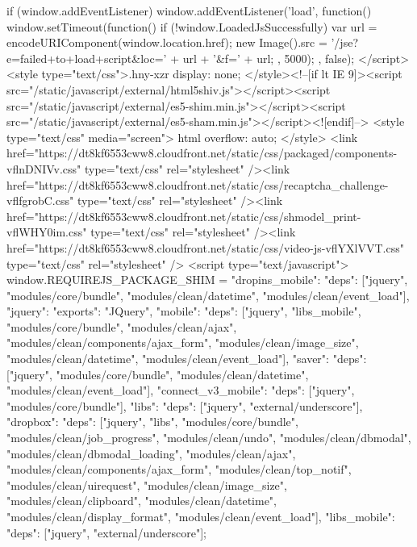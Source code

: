 {    if (window.addEventListener) {
        window.addEventListener('load', function() {
            window.setTimeout(function() {
                if (!window.LoadedJsSuccessfully) {
                    var url = encodeURIComponent(window.location.href);
                    new Image().src = '/jse?e=failed+to+load+script&loc=' + url + '&f=' + url;
                }
            }, 5000);
        }, false);
    }
</script><style type="text/css">.hny-xzr { display: none; }</style><!--[if lt IE 9]><script src="/static/javascript/external/html5shiv.js"></script><script src="/static/javascript/external/es5-shim.min.js"></script><script src="/static/javascript/external/es5-sham.min.js"></script><![endif]-->  
            <style type="text/css" media="screen">
                html {
                  overflow: auto;
                }
            </style>
        <link href="https://dt8kf6553cww8.cloudfront.net/static/css/packaged/components-vflnDNIVv.css" type="text/css" rel="stylesheet" /><link href="https://dt8kf6553cww8.cloudfront.net/static/css/recaptcha_challenge-vflfgrobC.css" type="text/css" rel="stylesheet" /><link href="https://dt8kf6553cww8.cloudfront.net/static/css/shmodel_print-vflWHY0im.css" type="text/css" rel="stylesheet" /><link href="https://dt8kf6553cww8.cloudfront.net/static/css/video-js-vflYXlVVT.css" type="text/css" rel="stylesheet" /> <script type="text/javascript">
                        window.REQUIREJS_PACKAGE_SHIM = {"dropins_mobile": {"deps": ["jquery", "modules/core/bundle", "modules/clean/datetime", "modules/clean/event_load"]}, "jquery": {"exports": "JQuery"}, "mobile": {"deps": ["jquery", "libs_mobile", "modules/core/bundle", "modules/clean/ajax", "modules/clean/components/ajax_form", "modules/clean/image_size", "modules/clean/datetime", "modules/clean/event_load"]}, "saver": {"deps": ["jquery", "modules/core/bundle", "modules/clean/datetime", "modules/clean/event_load"]}, "connect_v3_mobile": {"deps": ["jquery", "modules/core/bundle"]}, "libs": {"deps": ["jquery", "external/underscore"]}, "dropbox": {"deps": ["jquery", "libs", "modules/core/bundle", "modules/clean/job_progress", "modules/clean/undo", "modules/clean/dbmodal", "modules/clean/dbmodal_loading", "modules/clean/ajax", "modules/clean/components/ajax_form", "modules/clean/top_notif", "modules/clean/uirequest", "modules/clean/image_size", "modules/clean/clipboard", "modules/clean/datetime", "modules/clean/display_format", "modules/clean/event_load"]}, "libs_mobile": {"deps": ["jquery", "external/underscore"]}};
}
